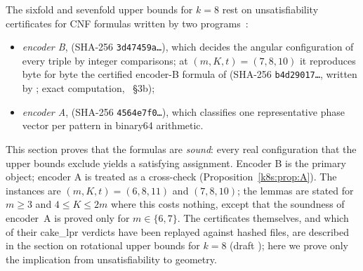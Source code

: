 The sixfold and sevenfold upper bounds for $k=8$ rest on unsatisfiability certificates for CNF formulas written by
two programs~\cite{Supp}:
\begin{itemize}
\item \emph{encoder B},  (SHA-256 \texttt{3d47459a\dots}), which decides the angular
configuration of every triple by integer comparisons; at $(m,K,t)=(7,8,10)$ it reproduces byte for byte the certified
encoder-B formula of  (SHA-256 \texttt{b4d29017\dots}, written by ; exact
computation, ~\S3b);
\item \emph{encoder A},  (SHA-256 \texttt{4564e7f0\dots}), which classifies one representative
phase vector per pattern in binary64 arithmetic.
\end{itemize}
This section proves that the formulas are \emph{sound}: every real configuration that the upper bounds exclude
yields a satisfying assignment. Encoder B is the primary object; encoder A is treated as a cross-check
(Proposition~\ref{k8s:prop:A}). The instances are $(m,K,t)=(6,8,11)$ and $(7,8,10)$; the lemmas are stated for $m\ge3$
and $4\le K\le 2m$ where this costs nothing, except that the soundness of encoder~A is proved only for
$m\in\{6,7\}$. The certificates themselves, and which of their cake\_lpr verdicts have
been replayed against hashed files, are described in the section on rotational upper bounds for $k=8$ (draft
); here we prove only the implication from unsatisfiability to geometry.

